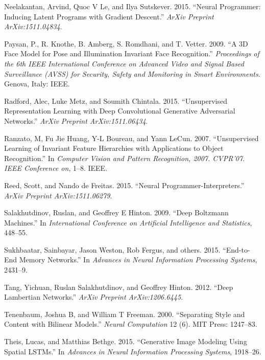 \documentclass[12pt,twoside]{mitthesis}
\begin{document}
\hypertarget{ref-neelakantan2015neural}{}
Neelakantan, Arvind, Quoc V Le, and Ilya Sutskever. 2015. ``Neural
Programmer: Inducing Latent Programs with Gradient Descent.''
\emph{ArXiv Preprint ArXiv:1511.04834}.

\hypertarget{ref-paysan2009face}{}
Paysan, P., R. Knothe, B. Amberg, S. Romdhani, and T. Vetter. 2009. ``A
3D Face Model for Pose and Illumination Invariant Face Recognition.''
\emph{Proceedings of the 6th IEEE International Conference on Advanced
Video and Signal Based Surveillance (AVSS) for Security, Safety and
Monitoring in Smart Environments}. Genova, Italy: IEEE.

\hypertarget{ref-radford2015unsupervised}{}
Radford, Alec, Luke Metz, and Soumith Chintala. 2015. ``Unsupervised
Representation Learning with Deep Convolutional Generative Adversarial
Networks.'' \emph{ArXiv Preprint ArXiv:1511.06434}.

\hypertarget{ref-ranzato2007unsupervised}{}
Ranzato, M, Fu Jie Huang, Y-L Boureau, and Yann LeCun. 2007.
``Unsupervised Learning of Invariant Feature Hierarchies with
Applications to Object Recognition.'' In \emph{Computer Vision and
Pattern Recognition, 2007. CVPR'07. IEEE Conference on}, 1--8. IEEE.

\hypertarget{ref-reed2015neural}{}
Reed, Scott, and Nando de Freitas. 2015. ``Neural
Programmer-Interpreters.'' \emph{ArXiv Preprint ArXiv:1511.06279}.

\hypertarget{ref-salakhutdinov2009deep}{}
Salakhutdinov, Ruslan, and Geoffrey E Hinton. 2009. ``Deep Boltzmann
Machines.'' In \emph{International Conference on Artificial Intelligence
and Statistics}, 448--55.

\hypertarget{ref-sukhbaatar2015end}{}
Sukhbaatar, Sainbayar, Jason Weston, Rob Fergus, and others. 2015.
``End-to-End Memory Networks.'' In \emph{Advances in Neural Information
Processing Systems}, 2431--9.

\hypertarget{ref-tang2012deep}{}
Tang, Yichuan, Ruslan Salakhutdinov, and Geoffrey Hinton. 2012. ``Deep
Lambertian Networks.'' \emph{ArXiv Preprint ArXiv:1206.6445}.

\hypertarget{ref-tenenbaum2000separating}{}
Tenenbaum, Joshua B, and William T Freeman. 2000. ``Separating Style and
Content with Bilinear Models.'' \emph{Neural Computation} 12 (6). MIT
Press: 1247--83.

\hypertarget{ref-theis2015generative}{}
Theis, Lucas, and Matthias Bethge. 2015. ``Generative Image Modeling
Using Spatial LSTMs.'' In \emph{Advances in Neural Information
Processing Systems}, 1918--26.
\end{document}
